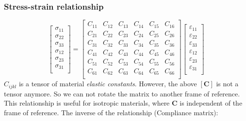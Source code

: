 \documentclass[notes]{beamer}
\begin{document}
\begin{frame}
\frametitle{Stress-strain relationship}
\begin{equation*}
\begin{bmatrix}
	\sigma_{11} \\
	\sigma_{22} \\
	\sigma_{33} \\
	\sigma_{12} \\
	\sigma_{23} \\
	\sigma_{31} \\
\end{bmatrix} %
= %
\begin{bmatrix}
	C_{11} & C_{12} & C_{13} & C_{14} &   C_{15} & C_{16}\\
	C_{21} & C_{22} & C_{23} & C_{24} &   C_{25} & C_{26}\\
	C_{31} & C_{32} & C_{33} & C_{34} &   C_{35} & C_{36}\\
	C_{41} & C_{42} & C_{43} & C_{44} &   C_{45} & C_{46}\\
	C_{51} & C_{52} & C_{53} & C_{54} &   C_{55} & C_{56}\\
	C_{61} & C_{62} & C_{63} & C_{64} &   C_{65} & C_{66}\\
\end{bmatrix} %
\begin{bmatrix}
\varepsilon_{11} \\
\varepsilon_{22} \\
\varepsilon_{33} \\
\varepsilon_{12} \\
\varepsilon_{23} \\
\varepsilon_{31} \\
\end{bmatrix}
\end{equation*}
$C_{ijkl}$ is a tensor of material \textit{elastic constants}. However, the above $[\mathbf{C}]$ is not a tensor anymore. So we can not rotate the matrix to another frame of reference. This relationship is useful for isotropic materials, where $\mathbf{C}$ is independent of the frame of reference. 
The inverse of the relationship (Compliance matrix): 
\end{frame}
\end{document}
